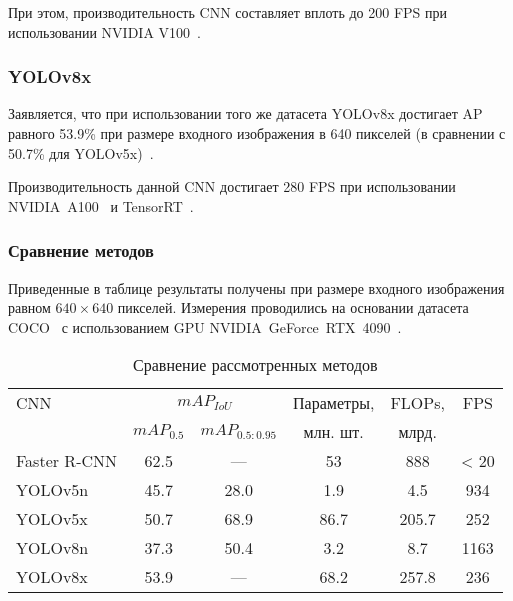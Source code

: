 При этом, производительность CNN составляет вплоть до 200 FPS при использовании NVIDIA V100~\cite{nvidia-v100}.

\subsubsection*{YOLOv8x}

Заявляется, что при использовании того же датасета YOLOv8x достигает AP равного 53.9\% при размере входного изображения в 640 пикселей (в сравнении с 50.7\% для YOLOv5x)~\cite{yolo-review-2023}.

Производительность данной CNN достигает 280 FPS при использовании NVIDIA~A100~\cite{nvidia-a100} и TensorRT~\cite{nvidia-tensorrt}.

\subsubsection*{Сравнение методов}

Приведенные в таблице результаты получены при размере входного изображения равном $640 \times 640$ пикселей. Измерения проводились на основании датасета COCO~\cite{coco-benchmark} с использованием GPU NVIDIA~GeForce~RTX~4090~\cite{rtx4090}.

\begin{table}[!h]
    \small
    \begin{center}
        \caption{Сравнение рассмотренных методов}
        \label{tbl:cmp-by-ap}
        \begin{tabular}{|l|cc|c|c|c|}
            \hline
            CNN & \multicolumn{2}{c|}{$mAP_{IoU}$} & Параметры, & FLOPs, & FPS \\
                & $mAP_{0.5}$ & $mAP_{0.5:0.95}$    & млн. шт.   & млрд.  & \\\hline

            Faster R-CNN & 62.5 & ---  & 53   & 888   & < 20 \\
            YOLOv5n      & 45.7 & 28.0 & 1.9  & 4.5   & 934 \\
            YOLOv5x      & 50.7 & 68.9 & 86.7 & 205.7 & 252 \\
            YOLOv8n      & 37.3 & 50.4 & 3.2  & 8.7   & 1163 \\
            YOLOv8x      & 53.9 & ---  & 68.2 & 257.8 & 236 \\
            \hline
        \end{tabular}
    \end{center}
\end{table}


